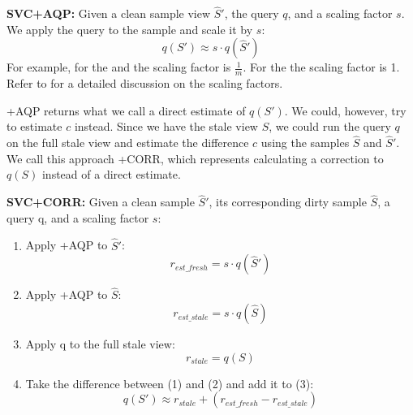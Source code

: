 \vspace{0.25em}

\noindent\textbf{SVC+AQP: }  Given a clean sample view $\widehat{S}'$, the query $q$, and a scaling factor $s$. 
We apply the query to the sample and scale it by $s$:
\[
q(S') \approx s \cdot q(\widehat{S}')
\]
For example, for the \sumfunc and \countfunc the scaling factor is $\frac{1}{m}$. For the \avgfunc the scaling factor is 1.
Refer to \cite{OlkenR86, AgarwalMPMMS13} for a detailed discussion on the scaling factors.

\svcnospace+AQP returns what we call a direct estimate of $q(S')$.
We could, however, try to estimate $c$ instead.
Since we have the stale view $S$, we could run the query $q$ on the full stale view and 
estimate the difference $c$ using the samples $\widehat{S}$ and $\widehat{S}'$.
We call this approach \svcnospace+CORR, which represents calculating a correction to $q(S)$ instead of a direct estimate.

\vspace{0.25em}

\noindent\textbf{SVC+CORR: } Given a clean sample $\widehat{S}'$, its corresponding dirty sample $\widehat{S}$, a query q, and a scaling factor $s$:
\begin{enumerate}[noitemsep]
\item Apply \svcnospace+AQP to $\widehat{S}'$:
\[ r_{est\_fresh} = s \cdot q(\widehat{S}') \] 
\item Apply \svcnospace+AQP to $\widehat{S}$:
\[ r_{est\_stale} = s \cdot q(\widehat{S}) \] 
\item Apply q to the full stale view:
\[ r_{stale} = q(S) \]
\item Take the difference between (1) and (2) and add it to (3):
\[
q(S') \approx r_{stale} + (r_{est\_fresh} - r_{est\_stale})
\]
\end{enumerate}

